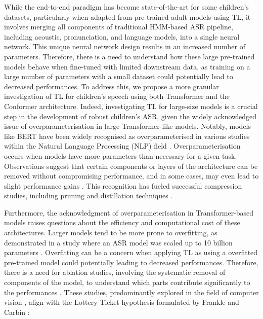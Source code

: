 While the end-to-end paradigm has become state-of-the-art for some children's datasets, particularly when adapted from pre-trained adult models using TL, it involves merging all components of traditional HMM-based ASR pipeline, including acoustic, pronunciation, and language models, into a single neural network. This unique neural network design results in an increased number of parameters. Therefore, there is a need to understand how these large pre-trained models behave when fine-tuned with limited downstream data, as training on a large number of parameters with a small dataset could potentially lead to decreased performances. To address this, we propose a more granular investigation of TL for children's speech using both Transformer and the Conformer architecture.
Indeed, investigating TL for large-size models is a crucial step in the development of robust children's ASR, given the widely acknowledged issue of overparameterisation in large Transformer-like models. Notably, models like BERT \cite{Bert} have been widely recognised as overparameterised in various studies within the Natural Language Processing (NLP) field \cite{kovaleva-etal-2019-revealing,michel2019sixteen}. Overparameterisation occurs when models have more parameters than necessary for a given task. Observations suggest that certain components or layers of the architecture can be removed without compromising performance, and in some cases, may even lead to slight performance gains \cite{kovaleva-etal-2019-revealing,michel2019sixteen,ye2023partial}. This recognition has fueled successful compression studies, including pruning and distillation techniques \cite{mccarley2019structured,sanh2019distilbert}. 

Furthermore, the acknowledgment of overparameterisation in Transformer-based models raises questions about the efficiency and computational cost of these architectures. Larger models tend to be more prone to overfitting, as demonstrated in a study where an ASR model was scaled up to 10 billion parameters \cite{zheng22d_interspeech}. Overfitting can be a concern when applying TL as using a overfitted pre-trained model could potentially  leading to decreased performances. Therefore, there is a need for ablation studies, involving the systematic removal of components of the model, to understand which parts contribute significantly to the performances \cite{shen2021partial,wang2021fine}. These studies, predominantly explored in the field of computer vision \cite{ye2023partial}, align with the Lottery Ticket hypothesis formulated by Frankle and Carbin \cite{frankle2018lottery}: 

